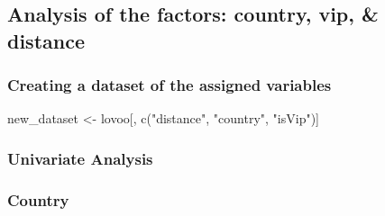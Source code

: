 \documentclass[
]{article}
\newenvironment{Shaded}{\begin{snugshade}}{\end{snugshade}}
\newcommand{\AttributeTok}[1]{\textcolor[rgb]{0.77,0.63,0.00}{#1}}
\newcommand{\DecValTok}[1]{\textcolor[rgb]{0.00,0.00,0.81}{#1}}
\newcommand{\FloatTok}[1]{\textcolor[rgb]{0.00,0.00,0.81}{#1}}
\newcommand{\FunctionTok}[1]{\textcolor[rgb]{0.00,0.00,0.00}{#1}}
\newcommand{\NormalTok}[1]{#1}
\newcommand{\OtherTok}[1]{\textcolor[rgb]{0.56,0.35,0.01}{#1}}
\newcommand{\SpecialCharTok}[1]{\textcolor[rgb]{0.00,0.00,0.00}{#1}}
\newcommand{\StringTok}[1]{\textcolor[rgb]{0.31,0.60,0.02}{#1}}
\begin{document}
\hypertarget{analysis-of-the-factors-country-vip-distance}{%
\subsection{Analysis of the factors: country, vip, \&
distance}\label{analysis-of-the-factors-country-vip-distance}}

\hypertarget{creating-a-dataset-of-the-assigned-variables}{%
\subsubsection{Creating a dataset of the assigned
variables}\label{creating-a-dataset-of-the-assigned-variables}}

\begin{Shaded}
\begin{Highlighting}[]
\NormalTok{new\_dataset }\OtherTok{\textless{}{-}}\NormalTok{ lovoo[, }\FunctionTok{c}\NormalTok{(}\StringTok{"distance"}\NormalTok{, }\StringTok{"country"}\NormalTok{, }\StringTok{"isVip"}\NormalTok{)]}
\end{Highlighting}
\end{Shaded}

\hypertarget{univariate-analysis}{%
\subsubsection{Univariate Analysis}\label{univariate-analysis}}

\hypertarget{country}{%
\subsubsection{Country}\label{country}}

\begin{Shaded}
\end{Shaded}
\end{document}
